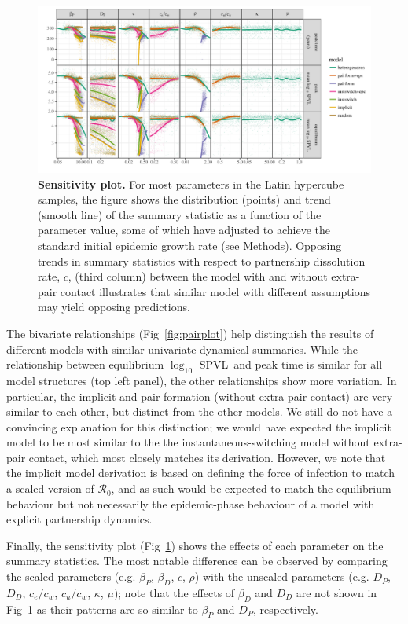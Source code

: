 \documentclass[10pt,letterpaper]{article}
\renewcommand{\figurename}{Fig}
\newcommand{\Lspvl}{$\log_{10}$ SPVL}
\newcommand{\rzero}{{\mathcal R}_0}
\begin{document}
\begin{figure}[!ht]
\includegraphics[width=\textwidth]{../figures/fig5.pdf}
\caption{{\bf Sensitivity plot.}
For most parameters in the Latin hypercube samples, the figure shows the distribution (points) and trend (smooth line) of the summary statistic as a function of the parameter value, some of which have adjusted to achieve the standard initial epidemic growth rate (see Methods).
Opposing trends in summary statistics with respect to partnership dissolution rate, $c$, (third column) between the model with and without extra-pair contact illustrates that similar model with different assumptions may yield opposing predictions.
}
\label{fig:plot_sens}
\end{figure}

The bivariate relationships (\figurename~\ref{fig:pairplot}) help distinguish the results of 
different models with similar univariate dynamical summaries. While the
relationship between equilibrium \Lspvl\ and peak time is
similar for all model structures (top left panel), the other
relationships show more variation. In particular, the implicit
and pair-formation (without extra-pair contact) are very similar
to each other, but distinct from the other models. We still do
not have a convincing explanation for this distinction; we
would have expected the implicit model to be most similar to the
the instantaneous-switching model without extra-pair contact,
which most closely matches its derivation. However, we note
that the implicit model derivation is based on defining
the force of infection to match a scaled version of $\rzero$,
and as such would be expected to match the equilibrium behaviour
but not necessarily the epidemic-phase behaviour of a model
with explicit partnership dynamics.

Finally, the sensitivity plot (\figurename~\ref{fig:plot_sens}) shows the effects 
of each parameter on the summary statistics. 
The most notable difference can be observed by comparing the scaled parameters (e.g. $\beta_P$, $\beta_D$, $c$, $\rho$) with the unscaled parameters (e.g. $D_P$, $D_D$, $c_e/c_w$, $c_u/c_w$, $\kappa$, $\mu$);
note that the effects of $\beta_D$ and $D_D$ are not shown in \figurename~\ref{fig:plot_sens} as their patterns are so similar to $\beta_P$ and $D_P$, respectively.
\end{document}

